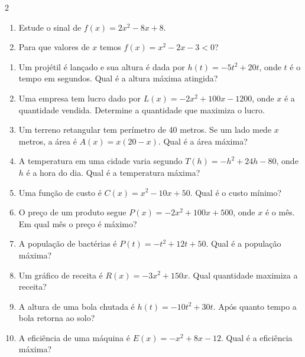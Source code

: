 \documentclass[11pt]{article}
\begin{document}
\begin{multicols}{2}
\begin{enumerate}[leftmargin=*, start=16]
\item Estude o sinal de $f(x) = 2x^2 - 8x + 8$.

\item Para que valores de $x$ temos $f(x) = x^2 - 2x - 3 < 0$?

\end{enumerate}


\begin{enumerate}[leftmargin=*, start=21]

\item Um projétil é lançado e sua altura é dada por $h(t) = -5t^2 + 20t$, onde $t$ é o tempo em segundos. Qual é a altura máxima atingida?

\item Uma empresa tem lucro dado por $L(x) = -2x^2 + 100x - 1200$, onde $x$ é a quantidade vendida. Determine a quantidade que maximiza o lucro.

\item Um terreno retangular tem perímetro de 40 metros. Se um lado mede $x$ metros, a área é $A(x) = x(20 - x)$. Qual é a área máxima?

\item A temperatura em uma cidade varia segundo $T(h) = -h^2 + 24h - 80$, onde $h$ é a hora do dia. Qual é a temperatura máxima?

\item Uma função de custo é $C(x) = x^2 - 10x + 50$. Qual é o custo mínimo?

\item O preço de um produto segue $P(x) = -2x^2 + 100x + 500$, onde $x$ é o mês. Em qual mês o preço é máximo?

\item A população de bactérias é $P(t) = -t^2 + 12t + 50$. Qual é a população máxima?

\item Um gráfico de receita é $R(x) = -3x^2 + 150x$. Qual quantidade maximiza a receita?

\item A altura de uma bola chutada é $h(t) = -10t^2 + 30t$. Após quanto tempo a bola retorna ao solo?

\item A eficiência de uma máquina é $E(x) = -x^2 + 8x - 12$. Qual é a eficiência máxima?

\end{enumerate}

\end{multicols}
\end{document}
